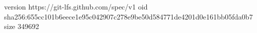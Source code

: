 version https://git-lfs.github.com/spec/v1
oid sha256:655cc101b6eece1e95c042907c278e9be50d584771de4201d0e161bb05fda0b7
size 349692
